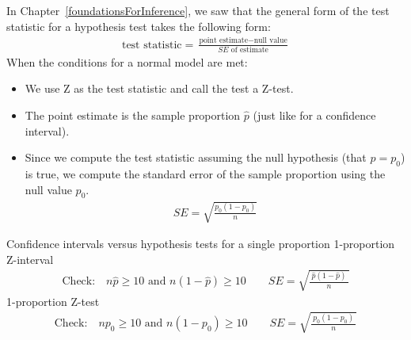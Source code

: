 In Chapter~\ref{foundationsForInference}, we saw that the general form of the test statistic for a hypothesis test takes the following form:
\begin{align*}
\text{test statistic} = \frac{\text{point estimate} - \text{null value}}{SE \text{ of estimate}}
\end{align*}
When the conditions for a normal model are met:
\begin{itemize}
\item We use Z as the test statistic and call the test a Z-test.
\item The point estimate is the sample proportion $\hat{p}$ (just like for a confidence interval).
\item Since we compute the test statistic assuming the null hypothesis (that $p = p_0$) is true, we compute the standard error of the sample proportion using the null value $p_0$.
\begin{align*}
SE = \sqrt{\frac{p_0(1-p_0)}{n}}
\end{align*}
\end{itemize}


\begin{onebox}{Confidence intervals versus hypothesis tests for a single proportion}
1-proportion Z-interval
\begin{align*}
\text{Check:}\quad n\hat{p}\ge 10 \text{ and }n(1-\hat{p})\ge 10 \qquad SE = \sqrt{\frac{\ \hat{p}(1-\hat{p})\ }{n}}
\end{align*}
1-proportion Z-test
\begin{align*}
\text{Check:}\quad  np_0\ge 10 \text{ and } n(1-p_0)\ge 10 \qquad SE = \sqrt{\frac{\ p_0(1-p_0)\ }{n}}
\end{align*}
\end{onebox}


